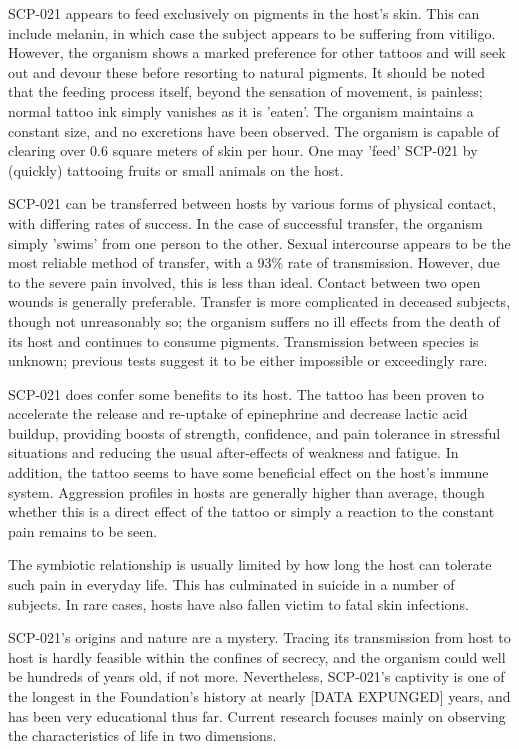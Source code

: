 SCP-021 appears to feed exclusively on pigments in the host's skin. This can include melanin, in which case the subject appears to be suffering from vitiligo. However, the organism shows a marked preference for other tattoos and will seek out and devour these before resorting to natural pigments. It should be noted that the feeding process itself, beyond the sensation of movement, is painless; normal tattoo ink simply vanishes as it is 'eaten'. The organism maintains a constant size, and no excretions have been observed. The organism is capable of clearing over 0.6 square meters of skin per hour. One may 'feed' SCP-021 by (quickly) tattooing fruits or small animals on the host.

SCP-021 can be transferred between hosts by various forms of physical contact, with differing rates of success. In the case of successful transfer, the organism simply 'swims' from one person to the other. Sexual intercourse appears to be the most reliable method of transfer, with a 93\% rate of transmission. However, due to the severe pain involved, this is less than ideal. Contact between two open wounds is generally preferable. Transfer is more complicated in deceased subjects, though not unreasonably so; the organism suffers no ill effects from the death of its host and continues to consume pigments. Transmission between species is unknown; previous tests suggest it to be either impossible or exceedingly rare.

SCP-021 does confer some benefits to its host. The tattoo has been proven to accelerate the release and re-uptake of epinephrine and decrease lactic acid buildup, providing boosts of strength, confidence, and pain tolerance in stressful situations and reducing the usual after-effects of weakness and fatigue. In addition, the tattoo seems to have some beneficial effect on the host's immune system. Aggression profiles in hosts are generally higher than average, though whether this is a direct effect of the tattoo or simply a reaction to the constant pain remains to be seen.

The symbiotic relationship is usually limited by how long the host can tolerate such pain in everyday life. This has culminated in suicide in a number of subjects. In rare cases, hosts have also fallen victim to fatal skin infections.

SCP-021's origins and nature are a mystery. Tracing its transmission from host to host is hardly feasible within the confines of secrecy, and the organism could well be hundreds of years old, if not more. Nevertheless, SCP-021's captivity is one of the longest in the Foundation's history at nearly [DATA EXPUNGED] years, and has been very educational thus far. Current research focuses mainly on observing the characteristics of life in two dimensions.